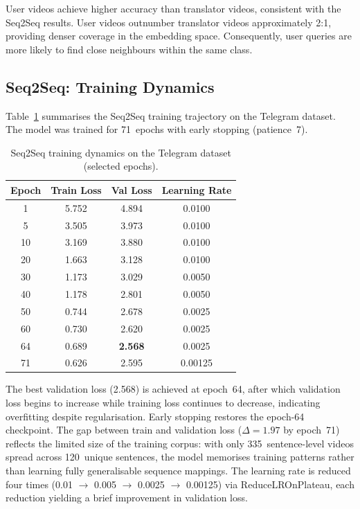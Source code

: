 \documentclass[runningheads]{llncs}
\begin{document}
User videos achieve higher accuracy than translator videos,
consistent with the Seq2Seq results.
User videos outnumber translator videos approximately 2:1, providing
denser coverage in the embedding space.
Consequently, user queries are more likely to find close neighbours
within the same class.

\subsection{Seq2Seq: Training Dynamics}\label{sec:training_results}

Table~\ref{tab:training} summarises the Seq2Seq training trajectory
on the Telegram dataset.
The model was trained for 71~epochs with early stopping (patience~7).

\begin{table}[t]
\centering
\caption{Seq2Seq training dynamics on the Telegram dataset (selected epochs).}
\label{tab:training}
\begin{tabular}{@{}cccc@{}}
\toprule
Epoch & Train Loss & Val Loss & Learning Rate \\
\midrule
1  & 5.752 & 4.894 & 0.0100 \\
5  & 3.505 & 3.973 & 0.0100 \\
10 & 3.169 & 3.880 & 0.0100 \\
20 & 1.663 & 3.128 & 0.0100 \\
30 & 1.173 & 3.029 & 0.0050 \\
40 & 1.178 & 2.801 & 0.0050 \\
50 & 0.744 & 2.678 & 0.0025 \\
60 & 0.730 & 2.620 & 0.0025 \\
64 & 0.689 & \textbf{2.568} & 0.0025 \\
71 & 0.626 & 2.595 & 0.00125 \\
\bottomrule
\end{tabular}
\end{table}

The best validation loss (2.568) is achieved at epoch~64, after which
validation loss begins to increase while training loss continues to
decrease, indicating overfitting despite regularisation.
Early stopping restores the epoch-64 checkpoint.
The gap between train and validation loss ($\Delta = 1.97$ by
epoch~71) reflects the limited size of the training corpus: with
only 335~sentence-level videos spread across 120~unique sentences,
the model memorises training patterns rather than learning fully
generalisable sequence mappings.
The learning rate is reduced four times (0.01 $\rightarrow$ 0.005
$\rightarrow$ 0.0025 $\rightarrow$ 0.00125) via
ReduceLROnPlateau, each reduction yielding a brief improvement
in validation loss.
\end{document}
